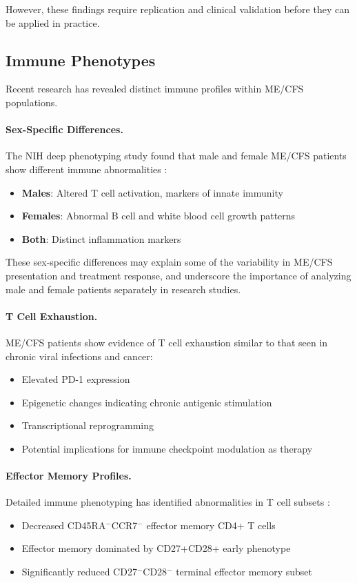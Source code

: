 However, these findings require replication and clinical validation before they can be applied in practice.

\subsection{Immune Phenotypes}

Recent research has revealed distinct immune profiles within ME/CFS populations.

\paragraph{Sex-Specific Differences.}
The NIH deep phenotyping study found that male and female ME/CFS patients show different immune abnormalities \cite{walitt2024deep}:
\begin{itemize}
    \item \textbf{Males}: Altered T cell activation, markers of innate immunity
    \item \textbf{Females}: Abnormal B cell and white blood cell growth patterns
    \item \textbf{Both}: Distinct inflammation markers
\end{itemize}

These sex-specific differences may explain some of the variability in ME/CFS presentation and treatment response, and underscore the importance of analyzing male and female patients separately in research studies.

\paragraph{T Cell Exhaustion.}
ME/CFS patients show evidence of T cell exhaustion similar to that seen in chronic viral infections and cancer:
\begin{itemize}
    \item Elevated PD-1 expression
    \item Epigenetic changes indicating chronic antigenic stimulation
    \item Transcriptional reprogramming
    \item Potential implications for immune checkpoint modulation as therapy
\end{itemize}

\paragraph{Effector Memory Profiles.}
Detailed immune phenotyping has identified abnormalities in T cell subsets \cite{heng2025mecfs}:
\begin{itemize}
    \item Decreased CD45RA$^-$CCR7$^-$ effector memory CD4+ T cells
    \item Effector memory dominated by CD27+CD28+ early phenotype
    \item Significantly reduced CD27$^-$CD28$^-$ terminal effector memory subset
\end{itemize}

